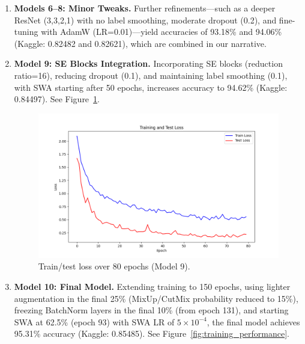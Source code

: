 \documentclass[letterpaper]{article}
\begin{document}
\begin{enumerate}
    \item \textbf{Models 6--8: Minor Tweaks.} Further refinements—such as a deeper ResNet (3,3,2,1) with no label smoothing, moderate dropout (0.2), and fine-tuning with AdamW (LR=0.01)—yield accuracies of 93.18\% and 94.06\% (Kaggle: 0.82482 and 0.82621), which are combined in our narrative.

    \item \textbf{Model 9: SE Blocks Integration.} Incorporating SE blocks (reduction ratio=16), reducing dropout (0.1), and maintaining label smoothing (0.1), with SWA starting after 50 epochs, increases accuracy to 94.62\% (Kaggle: 0.84497). See Figure~\ref{fig:training_performance_9462}.
    
    \begin{figure}[ht]
    \centering
         \includegraphics[scale=0.3]{images/train_test_loss_94.62.png}
    \caption{Train/test loss over 80 epochs (Model 9).}
    \label{fig:training_performance_9462}
    \end{figure}

    \item \textbf{Model 10: Final Model.} Extending training to 150 epochs, using lighter augmentation in the final 25\% (MixUp/CutMix probability reduced to 15\%), freezing BatchNorm layers in the final 10\% (from epoch 131), and starting SWA at 62.5\% (epoch 93) with SWA LR of $5\times10^{-4}$, the final model achieves 95.31\% accuracy (Kaggle: 0.85485). See Figure~\ref{fig:training_performance}.
    

\end{enumerate}
\end{document}
